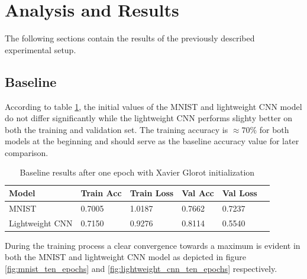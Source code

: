 \documentclass{article}
\theoremstyle{definition}
\theoremstyle{remark}
\begin{document}
\section{Analysis and Results}

The following sections contain the results of the previously described experimental setup.

\subsection{Baseline}

According to table \ref{tab:one_epoch_baseline_results_xavier}, the initial values of the MNIST and lightweight CNN model do not differ significantly while the lightweight CNN performs slighty better on both the training and validation set. The training accuracy is $\approx 70\%$ for both models at the beginning and should serve as the baseline accuracy value for later comparison.

\begin{table}[h!]
\center
\begin{tabular}{|l|l|l|l|l|l|}
\hline
\textbf{Model} & \textbf{Train Acc} & \textbf{Train Loss} & \textbf{Val Acc} & \textbf{Val Loss}\\ \hline
MNIST		  & 0.7005  & 1.0187   & 0.7662 & 0.7237 \\ \hline
Lightweight CNN    & 0.7150  & 0.9276  & 0.8114  &	0.5540 \\ \hline
\end{tabular}
\caption{Baseline results after one epoch with Xavier Glorot initialization}
\label{tab:one_epoch_baseline_results_xavier}
\end{table}

During the training process a clear convergence towards a maximum is evident in both the MNIST and lightweight CNN model as depicted in figure \ref{fig:mnist_ten_epochs} and \ref{fig:lightweight_cnn_ten_epochs} respectively. 
\end{document}
